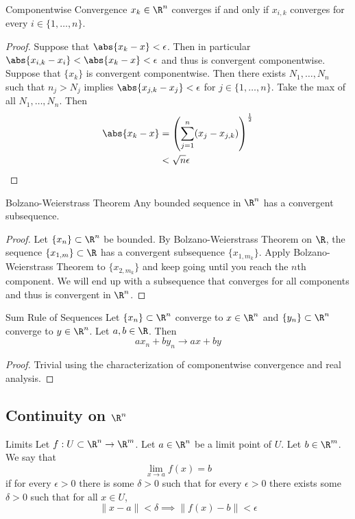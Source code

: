 \documentclass[a4paper]{article}
\begin{document}
\begin{prp}{Componentwise Convergence}{} $x _k\in\R^n$ converges if and only if $x _{i,k}$ converges for every $i\in\{1,\dots,n\}$. \tcbline
\begin{proof}
Suppose that $\abs{x _k-x }<\epsilon$. Then in particular $\abs{x _{i,k}-x _i}<\abs{x _k-x }<\epsilon$ and thus is convergent componentwise. Suppose that $\{x _k\}$ is convergent componentwise. Then there exists $N_1,\dots,N_n$ such that $n_j>N_j$ implies $\abs{x _{j,k}-x _j}<\epsilon$ for $j\in\{1,\dots,n\}$. Take the max of all $N_1,\dots,N_n$. Then 
\begin{align*}
\abs{x _k-x }&=\left(\sum_{j=1}^n(x _{j}-x _{j,k})\right)^{\frac{1}{2}}\\
&<\sqrt{n}\epsilon
\end{align*}
\end{proof}
\end{prp}

\begin{thm}{Bolzano-Weierstrass Theorem}{} Any bounded sequence in $\R^n$ has a convergent subsequence. \tcbline
\begin{proof} Let $\{x_n\}\subset\R^n$ be bounded. By Bolzano-Weierstrass Theorem on $\R$, the sequence $\{x_{1,m}\}\subset\R$ has a convergent subsequence $\{x_{1,m_k}\}$. Apply Bolzano-Weierstrass Theorem to $\{x_{2,m_k}\}$ and keep going until you reach the $n$th component. We will end up with a subsequence that converges for all components and thus is convergent in $\R^n$. 
\end{proof}
\end{thm}

\begin{prp}{Sum Rule of Sequences}{} Let $\{x_n\}\subset\R^n$ converge to $x\in\R^n$ and $\{y_n\}\subset\R^n$ converge to $y\in\R^n$. Let $a,b\in\R$. Then $$ax_n+by_n\to ax+by$$ \tcbline
\begin{proof}
Trivial using the characterization of componentwise convergence and real analysis. 
\end{proof}
\end{prp}

\subsection{Continuity on $\R^n$}
\begin{defn}{Limits}{} Let $f:U\subset\R^n\to\R^m$. Let $a\in\R^n$ be a limit point of $U$. Let $b\in\R^m$. We say that $$\lim_{x\to a}f(x)=b$$ if for every $\epsilon>0$ there is some $\delta>0$ such that for every $\epsilon>0$ there exists some $\delta>0$ such that for all $x\in U$, $$\|x-a\|<\delta\implies\|f(x)-b\|<\epsilon$$
\end{defn}
\end{document}

